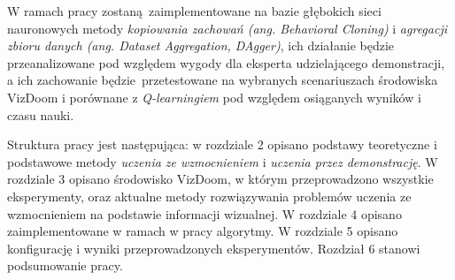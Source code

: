 W ramach pracy zostaną zaimplementowane na bazie głębokich sieci nauronowych metody \textit{kopiowania zachowań (ang. Behavioral Cloning)} i \textit{agregacji zbioru danych (ang. Dataset Aggregation, DAgger)}, ich działanie będzie przeanalizowane pod względem wygody dla eksperta udzielającego demonstracji, a ich zachowanie będzie przetestowane na wybranych scenariuszach środowiska VizDoom i porównane z \textit {Q-learningiem} pod względem osiąganych wyników i czasu nauki.

Struktura pracy jest następująca: w rozdziale 2 opisano podstawy teoretyczne i podstawowe metody \textit{uczenia ze wzmocnieniem} i \textit{uczenia przez demonstrację}. W rozdziale 3 opisano środowisko VizDoom, w którym przeprowadzono wszystkie eksperymenty, oraz aktualne metody rozwiązywania problemów uczenia ze wzmocnieniem na podstawie informacji wizualnej. W rozdziale 4 opisano zaimplementowane w ramach w pracy algorytmy. W rozdziale 5 opisano konfigurację i wyniki przeprowadzonych eksperymentów. Rozdział 6 stanowi podsumowanie pracy.




